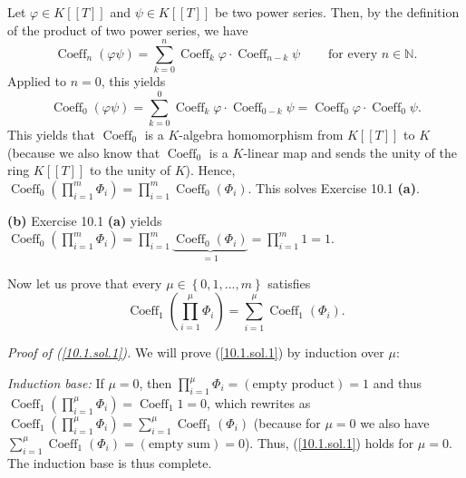 \documentclass[numbers=enddot,12pt,final,onecolumn,notitlepage]{scrartcl}%
\begin{document}
Let $\varphi\in K\left[  \left[  T\right]  \right]  $ and $\psi\in K\left[
\left[  T\right]  \right]  $ be two power series. Then, by the definition of
the product of two power series, we have%
\begin{equation}
\operatorname*{Coeff}\nolimits_{n}\left(  \varphi\psi\right)  =\sum_{k=0}%
^{n}\operatorname*{Coeff}\nolimits_{k}\varphi\cdot\operatorname*{Coeff}%
\nolimits_{n-k}\psi\ \ \ \ \ \ \ \ \ \ \text{for every }n\in\mathbb{N}\text{.}
\label{10.1.sol.0}%
\end{equation}
Applied to $n=0$, this yields%
\[
\operatorname*{Coeff}\nolimits_{0}\left(  \varphi\psi\right)  =\sum_{k=0}%
^{0}\operatorname*{Coeff}\nolimits_{k}\varphi\cdot\operatorname*{Coeff}%
\nolimits_{0-k}\psi=\operatorname*{Coeff}\nolimits_{0}\varphi\cdot
\operatorname*{Coeff}\nolimits_{0}\psi.
\]
This yields that $\operatorname*{Coeff}\nolimits_{0}$ is a $K$-algebra
homomorphism from $K\left[  \left[  T\right]  \right]  $ to $K$ (because we
also know that $\operatorname*{Coeff}\nolimits_{0}$ is a $K$-linear map and
sends the unity of the ring $K\left[  \left[  T\right]  \right]  $ to the
unity of $K$). Hence, $\operatorname*{Coeff}\nolimits_{0}\left(
\prod\limits_{i=1}^{m}\Phi_{i}\right)  =\prod\limits_{i=1}^{m}%
\operatorname*{Coeff}\nolimits_{0}\left(  \Phi_{i}\right)  $. This solves
Exercise 10.1 \textbf{(a)}.

\textbf{(b)} Exercise 10.1 \textbf{(a)} yields $\operatorname*{Coeff}%
\nolimits_{0}\left(  \prod\limits_{i=1}^{m}\Phi_{i}\right)  =\prod
\limits_{i=1}^{m}\underbrace{\operatorname*{Coeff}\nolimits_{0}\left(
\Phi_{i}\right)  }_{=1}=\prod\limits_{i=1}^{m}1=1$.

Now let us prove that every $\mu\in\left\{  0,1,...,m\right\}  $ satisfies%
\begin{equation}
\operatorname*{Coeff}\nolimits_{1}\left(  \prod\limits_{i=1}^{\mu}\Phi
_{i}\right)  =\sum\limits_{i=1}^{\mu}\operatorname*{Coeff}\nolimits_{1}\left(
\Phi_{i}\right)  . \label{10.1.sol.1}%
\end{equation}


\textit{Proof of (\ref{10.1.sol.1}).} We will prove (\ref{10.1.sol.1}) by
induction over $\mu$:

\textit{Induction base:} If $\mu=0$, then $\prod\limits_{i=1}^{\mu}\Phi
_{i}=\left(  \text{empty product}\right)  =1$ and thus $\operatorname*{Coeff}%
\nolimits_{1}\left(  \prod\limits_{i=1}^{\mu}\Phi_{i}\right)
=\operatorname*{Coeff}\nolimits_{1}1=0$, which rewrites as
$\operatorname*{Coeff}\nolimits_{1}\left(  \prod\limits_{i=1}^{\mu}\Phi
_{i}\right)  =\sum\limits_{i=1}^{\mu}\operatorname*{Coeff}\nolimits_{1}\left(
\Phi_{i}\right)  $ (because for $\mu=0$ we also have $\sum\limits_{i=1}^{\mu
}\operatorname*{Coeff}\nolimits_{1}\left(  \Phi_{i}\right)  =\left(
\text{empty sum}\right)  =0$). Thus, (\ref{10.1.sol.1}) holds for $\mu=0$. The
induction base is thus complete.
\end{document}
